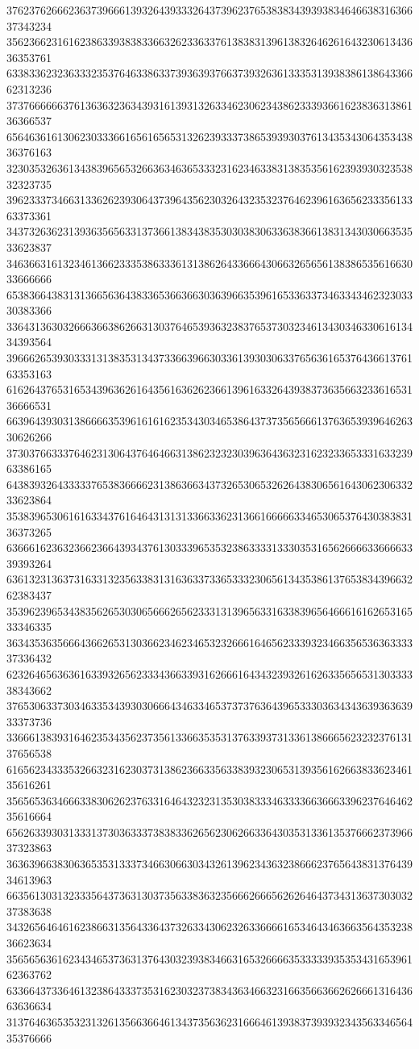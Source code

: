 37623762666236373966613932643933326437396237653838343939383464663831636637343234
35623662316162386339383833663262336337613838313961383264626164323061343636353761
63383362323633323537646338633739363937663739326361333531393838613864336662313236
37376666663761363632363439316139313263346230623438623339366162383631386136366537
65646361613062303336616561656531326239333738653939303761343534306435343836376163
32303532636134383965653266363463653332316234633831383535616239393032353832323735
39623337346631336262393064373964356230326432353237646239616365623335613363373361
34373263623139363565633137366138343835303038306336383661383134303066353533623837
34636631613234613662333538633361313862643366643066326565613838653561663033666666
65383664383131366563643833653663663036396635396165336337346334346232303330383366
33643136303266636638626631303764653936323837653730323461343034633061613434393564
39666265393033313138353134373366396630336139303063376563616537643661376163353163
61626437653165343963626164356163626236613961633264393837363566323361653136666531
66396439303138666635396161616235343034653864373735656661376365393964626330626266
37303766333764623130643764646631386232323039636436323162323365333163323963386165
64383932643333376538366662313863663437326530653262643830656164306230633233623864
35383965306161633437616464313131336633623136616666633465306537643038383136373265
63666162363236623664393437613033396535323863333133303531656266663366663339393264
63613231363731633132356338313163633733653332306561343538613765383439663262383437
35396239653438356265303065666265623331313965633163383965646661616265316533346335
36343536356664366265313036623462346532326661646562333932346635653636333337336432
62326465636361633932656233343663393162666164343239326162633565653130333338343662
37653063373034633534393030666434633465373737636439653330363434363936363933373736
33666138393164623534356237356133663535313763393731336138666562323237613137656538
61656234333532663231623037313862366335633839323065313935616266383362346135616261
35656536346663383062623763316464323231353038333463333663666339623764646235616664
65626339303133313730363337383833626562306266336430353133613537666237396637323863
36363966383063653531333734663066303432613962343632386662376564383137643934613963
66356130313233356437363130373563383632356662666562626464373431363730303237383638
34326564646162386631356433643732633430623263366661653464346366356435323836623634
35656563616234346537363137643032393834663165326666353333393535343165396162363762
63366437336461323864333735316230323738343634663231663566366262666131643663636634
31376463653532313261356636646134373563623166646139383739393234356334656435376666
